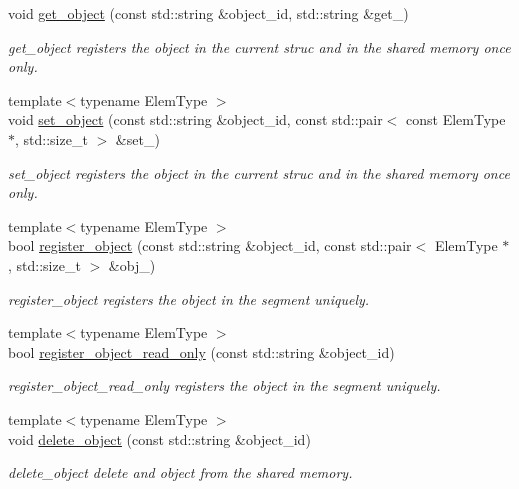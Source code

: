 \begin{DoxyCompactItemize}
void \hyperlink{classshared__memory_1_1SharedMemorySegment_a17aa3bfe778e05b543415b1e5137a26b}{get\+\_\+object} (const std\+::string \&object\+\_\+id, std\+::string \&get\+\_\+)
\begin{DoxyCompactList}\small\item\em get\+\_\+object registers the object in the current struc and in the shared memory once only. \end{DoxyCompactList}\item 
{\footnotesize template$<$typename Elem\+Type $>$ }\\void \hyperlink{classshared__memory_1_1SharedMemorySegment_a16e6213d7dd1984799bbd8fbe14225dc}{set\+\_\+object} (const std\+::string \&object\+\_\+id, const std\+::pair$<$ const Elem\+Type $\ast$, std\+::size\+\_\+t $>$ \&set\+\_\+)
\begin{DoxyCompactList}\small\item\em set\+\_\+object registers the object in the current struc and in the shared memory once only. \end{DoxyCompactList}\item 
{\footnotesize template$<$typename Elem\+Type $>$ }\\bool \hyperlink{classshared__memory_1_1SharedMemorySegment_a6987e8225fd20dbab12e5bb3f5305b75}{register\+\_\+object} (const std\+::string \&object\+\_\+id, const std\+::pair$<$ Elem\+Type $\ast$, std\+::size\+\_\+t $>$ \&obj\+\_\+)
\begin{DoxyCompactList}\small\item\em register\+\_\+object registers the object in the segment uniquely. \end{DoxyCompactList}\item 
{\footnotesize template$<$typename Elem\+Type $>$ }\\bool \hyperlink{classshared__memory_1_1SharedMemorySegment_a830fee375b183642b999f6a64240f280}{register\+\_\+object\+\_\+read\+\_\+only} (const std\+::string \&object\+\_\+id)
\begin{DoxyCompactList}\small\item\em register\+\_\+object\+\_\+read\+\_\+only registers the object in the segment uniquely. \end{DoxyCompactList}\item 
{\footnotesize template$<$typename Elem\+Type $>$ }\\void \hyperlink{classshared__memory_1_1SharedMemorySegment_abc658e54589c81e89b147f0b3fbd67b8}{delete\+\_\+object} (const std\+::string \&object\+\_\+id)
\begin{DoxyCompactList}\small\item\em delete\+\_\+object delete and object from the shared memory. \end{DoxyCompactList}\item 

\end{DoxyCompactItemize}
